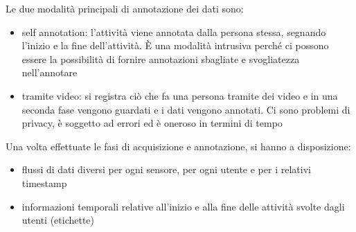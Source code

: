 Le due modalità principali di annotazione dei dati sono:
\begin{itemize}
    \item self annotation: l'attività viene annotata dalla persona stessa, segnando l'inizio e la fine dell'attività. 
    È una modalità intrusiva perché ci possono essere la possibilità di fornire annotazioni sbagliate e svogliatezza nell'annotare
    \item tramite video: si registra ciò che fa una persona tramite dei video e in una seconda fase vengono guardati e i dati vengono annotati. Ci sono problemi di privacy, è soggetto ad errori ed è oneroso in termini di tempo
\end{itemize} 

Una volta effettuate le fasi di acquisizione e annotazione, si hanno a disposizione: 
\begin{itemize}
    \item flussi di dati diversi per ogni sensore, per ogni utente e per i relativi timestamp
    \item informazioni temporali relative all'inizio e alla fine delle attività svolte dagli utenti (etichette)
\end{itemize} 